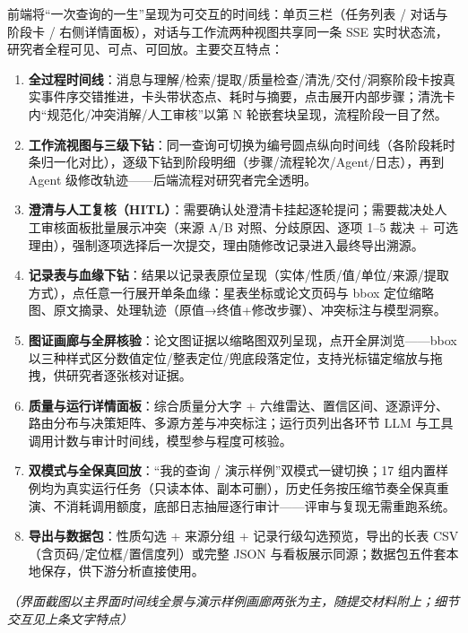 前端将“一次查询的一生”呈现为可交互的时间线：单页三栏（任务列表 / 对话与阶段卡 / 右侧详情面板），对话与工作流两种视图共享同一条 SSE 实时状态流，研究者全程可见、可点、可回放。主要交互特点：

\begin{enumerate}[leftmargin=1.6em,itemsep=2pt]
\item \textbf{全过程时间线}：消息与理解/检索/提取/质量检查/清洗/交付/洞察阶段卡按真实事件序交错推进，卡头带状态点、耗时与摘要，点击展开内部步骤；清洗卡内“规范化/冲突消解/人工审核”以第 N 轮嵌套块呈现，流程阶段一目了然。
\item \textbf{工作流视图与三级下钻}：同一查询可切换为编号圆点纵向时间线（各阶段耗时条归一化对比），逐级下钻到阶段明细（步骤/流程轮次/Agent/日志），再到 Agent 级修改轨迹——后端流程对研究者完全透明。
\item \textbf{澄清与人工复核（HITL）}：需要确认处澄清卡挂起逐轮提问；需要裁决处人工审核面板批量展示冲突（来源 A/B 对照、分歧原因、逐项 1--5 裁决 + 可选理由），强制逐项选择后一次提交，理由随修改记录进入最终导出溯源。
\item \textbf{记录表与血缘下钻}：结果以记录表原位呈现（实体/性质/值/单位/来源/提取方式），点任意一行展开单条血缘：星表坐标或论文页码与 bbox 定位缩略图、原文摘录、处理轨迹（原值→终值+修改步骤）、冲突标注与模型洞察。
\item \textbf{图证画廊与全屏核验}：论文图证据以缩略图双列呈现，点开全屏浏览——bbox 以三种样式区分数值定位/整表定位/兜底段落定位，支持光标锚定缩放与拖拽，供研究者逐张核对证据。
\item \textbf{质量与运行详情面板}：综合质量分大字 + 六维雷达、置信区间、逐源评分、路由分布与决策矩阵、多源方差与冲突标注；运行页列出各环节 LLM 与工具调用计数与审计时间线，模型参与程度可核验。
\item \textbf{双模式与全保真回放}：“我的查询 / 演示样例”双模式一键切换；17 组内置样例均为真实运行任务（只读本体、副本可删），历史任务按压缩节奏全保真重演、不消耗调用额度，底部日志抽屉逐行审计——评审与复现无需重跑系统。
\item \textbf{导出与数据包}：性质勾选 + 来源分组 + 记录行级勾选预览，导出的长表 CSV（含页码/定位框/置信度列）或完整 JSON 与看板展示同源；数据包五件套本地保存，供下游分析直接使用。
\end{enumerate}

\noindent\emph{（界面截图以主界面时间线全景与演示样例画廊两张为主，随提交材料附上；细节交互见上条文字特点）}
